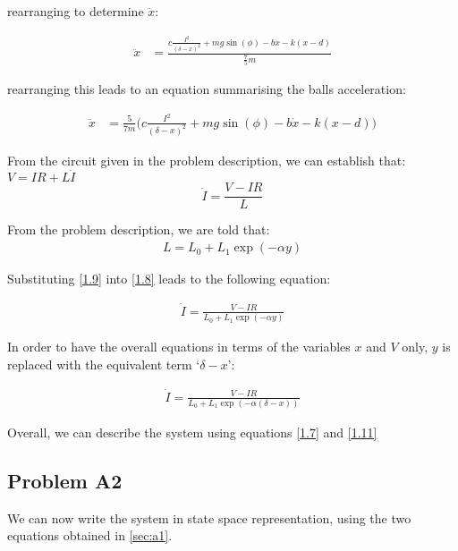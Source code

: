 \documentclass[a4paper,10pt,reqno]{amsart}
\numberwithin{equation}{section}
\begin{document}
rearranging to determine $\ddot{x}$:

\begin{align}
\ddot{x} &= \frac{c \frac{I^2}{(\delta - x)^2} + mg\sin(\phi) - b\dot{x} - k(x-d)}{\frac{7}{5}m} \label{1.6}
\end{align}

rearranging this leads to an equation summarising the balls acceleration:

\begin{align}
\ddot{x} &= \frac{5}{7m}\bigg(c \frac{I^2}{(\delta - x)^2} + mg\sin(\phi) - b\dot{x} - k(x-d)\bigg) \label{1.7}
\end{align}

\newline From the circuit given in the problem description, we can establish that:
$V = IR + L\dot{I}$
\begin{equation}
  \dot{I} = \frac{V - IR}{L} \label{1.8}
\end{equation}


\newline From the problem description, we are told that:
\begin{align}
L = L_0 + L_1\exp(-\alpha y) \label{1.9}
\end{align}

\newline Substituting \ref{1.9} into \ref{1.8} leads to the following equation:

\begin{align}
\dot{I} = \frac{V - IR}{L_0 + L_1\exp(-\alpha y)} \label{1.10}
\end{align}

\newline In order to have the overall equations in terms of the variables $x$ and $V$ only, $y$ is replaced with the equivalent term `$\delta - x$':

\begin{align}
\dot{I} = \frac{V - IR}{L_0 + L_1\exp(-\alpha (\delta - x))} \label{1.11}
\end{align}

\newline Overall, we can describe the system using equations \ref{1.7} and \ref{1.11}

\subsection{Problem A2}\label{sec:a2}
We can now write the system in state space representation, using the two equations obtained in \ref{sec:a1}.
\end{document}
